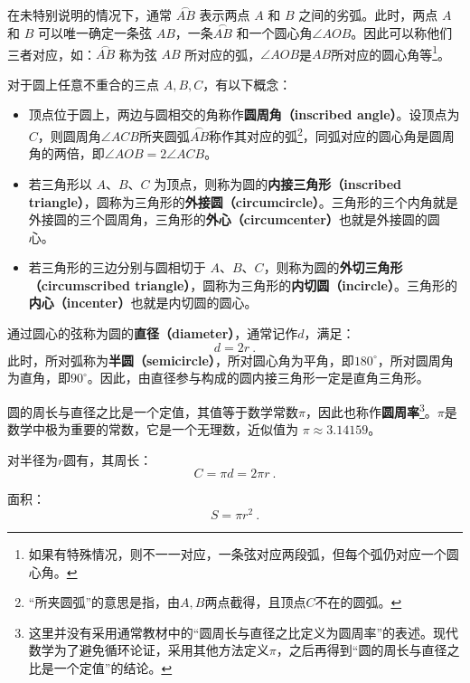 在未特别说明的情况下，通常 $\overset{\frown}{AB}$ 表示两点 $A$ 和 $B$ 之间的劣弧。此时，两点 $A$ 和 $B$ 可以唯一确定一条弦 $AB$，一条$\overset{\frown}{AB}$ 和一个圆心角$\angle AOB$。因此可以称他们三者对应，如：$\overset{\frown}{AB}$ 称为弦 $AB$ 所对应的弧，$\angle AOB$是$AB$所对应的圆心角等\footnote{如果有特殊情况，则不一一对应，一条弦对应两段弧，但每个弧仍对应一个圆心角。}。

对于圆上任意不重合的三点 $A,B,C$，有以下概念：
\begin{itemize}
\item 顶点位于圆上，两边与圆相交的角称作\textbf{圆周角（inscribed angle）}。设顶点为$C$，则圆周角$\angle ACB$所夹圆弧$\overset{\frown}{AB}$称作其对应的弧\footnote{“所夹圆弧”的意思是指，由$A,B$两点截得，且顶点$C$不在的圆弧。}，同弧对应的圆心角是圆周角的两倍，即$\angle AOB=2\angle ACB$。
\item 若三角形以 $A$、$B$、$C$ 为顶点，则称为圆的\textbf{内接三角形（inscribed triangle）}，圆称为三角形的\textbf{外接圆（circumcircle）}。三角形的三个内角就是外接圆的三个圆周角，三角形的\textbf{外心（circumcenter）}也就是外接圆的圆心。
\item 若三角形的三边分别与圆相切于 $A$、$B$、$C$，则称为圆的\textbf{外切三角形（circumscribed triangle）}，圆称为三角形的\textbf{内切圆（incircle）}。三角形的\textbf{内心（incenter）}也就是内切圆的圆心。
\end{itemize}

通过圆心的弦称为圆的\textbf{直径（diameter）}，通常记作$d$，满足：
\begin{equation}
d = 2r~.
\end{equation}
此时，所对弧称为\textbf{半圆（semicircle）}，所对圆心角为平角，即$180^\circ$，所对圆周角为直角，即$90^\circ$。因此，由直径参与构成的圆内接三角形一定是直角三角形。

圆的周长与直径之比是一个定值，其值等于数学常数$\pi$，因此也称作\textbf{圆周率}\footnote{这里并没有采用通常教材中的“圆周长与直径之比定义为圆周率”的表述。现代数学为了避免循环论证，采用其他方法定义$\pi$，之后再得到“圆的周长与直径之比是一个定值”的结论。}。$\pi$是数学中极为重要的常数，它是一个无理数，近似值为 $\pi \approx 3.14159$。

对半径为$r$圆有，其周长：
\begin{equation}
C = \pi d=2 \pi r~. 
\end{equation}

面积：
\begin{equation}
S = \pi r^2~.
\end{equation}


